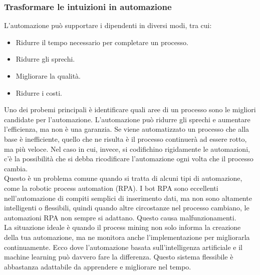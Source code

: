 \documentclass{article}
\begin{document}
\subsubsection{Trasformare le intuizioni in automazione}
L'automazione può supportare i dipendenti in diversi modi, tra cui:
\begin{itemize}
    \item Ridurre il tempo necessario per completare un processo.
    \item Ridurre gli sprechi.
    \item Migliorare la qualità.
    \item Ridurre i costi.
\end{itemize}
Uno dei probemi principali è identificare quali aree di un processo sono le migliori candidate per l'automazione. L'automazione può ridurre gli sprechi e aumentare l'efficienza, ma non è una garanzia. Se viene automatizzato un processo che alla base è inefficiente, quello che ne risulta è il processo continuerà ad essere rotto, ma più veloce. Nel caso in cui, invece, si codifichino rigidamente le automazioni, c'è la possibilità che si debba ricodificare l'automazione ogni volta che il processo cambia.\\
Questo è un problema comune quando si tratta di alcuni tipi di automazione, come la robotic process automation (RPA). I bot RPA sono eccellenti nell'automazione di compiti semplici di inserimento dati, ma non sono altamente intelligenti o flessibili, quindi quando altre circostanze nel processo cambiano, le automazioni RPA non sempre si adattano. Questo causa malfunzionamenti.\\
La situazione ideale è quando il process mining non solo informa la creazione della tua automazione, ma ne monitora anche l'implementazione per migliorarla continuamente. Ecco dove l'automazione basata sull'intelligenza artificiale e il machine learning può davvero fare la differenza. Questo sistema flessibile è abbastanza adattabile da apprendere e migliorare nel tempo.
\end{document}
